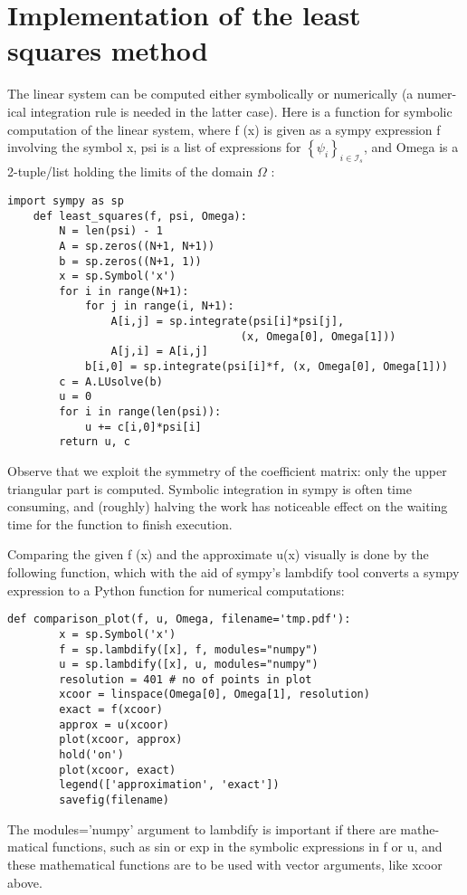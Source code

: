 \documentclass[../main.tex]{subfiles}
\begin{document}
\section[Implementation of the least squares method]{Implementation of the least squares method}
\label{sec:sec_2_4}
\noindent The linear system can be computed either symbolically or numerically (a numer-
ical integration rule is needed in the latter case). Here is a function for symbolic
computation of the linear system, where f (x) is given as a sympy expression f
involving the symbol x, psi is a list of expressions for $\left\{\psi_{i}\right\}_{i \in \mathcal{I}_{s}}$, and Omega is a 2-tuple/list holding the limits of the domain $\Omega$ :

\begin{lstlisting}[numbers=none]
	import sympy as sp
	def least_squares(f, psi, Omega):
		N = len(psi) - 1
		A = sp.zeros((N+1, N+1))
		b = sp.zeros((N+1, 1))
		x = sp.Symbol('x')
		for i in range(N+1):
			for j in range(i, N+1):
				A[i,j] = sp.integrate(psi[i]*psi[j],
									(x, Omega[0], Omega[1]))
				A[j,i] = A[i,j]
			b[i,0] = sp.integrate(psi[i]*f, (x, Omega[0], Omega[1]))
		c = A.LUsolve(b)
		u = 0
		for i in range(len(psi)):
			u += c[i,0]*psi[i]
		return u, c
\end{lstlisting}
Observe that we exploit the symmetry of the coefficient matrix: only the
upper triangular part is computed. Symbolic integration in sympy is often
time consuming, and (roughly) halving the work has noticeable effect on the
waiting time for the function to finish execution.

Comparing the given f (x) and the approximate u(x) visually is done by
the following function, which with the aid of sympy's lambdify tool converts a
sympy expression to a Python function for numerical computations:
\begin{lstlisting}[numbers=none]
	def comparison_plot(f, u, Omega, filename='tmp.pdf'):
		x = sp.Symbol('x')
		f = sp.lambdify([x], f, modules="numpy")
		u = sp.lambdify([x], u, modules="numpy")
		resolution = 401 # no of points in plot
		xcoor = linspace(Omega[0], Omega[1], resolution)
		exact = f(xcoor)
		approx = u(xcoor)
		plot(xcoor, approx)
		hold('on')
		plot(xcoor, exact)
		legend(['approximation', 'exact'])
		savefig(filename)
\end{lstlisting}
The modules='numpy' argument to lambdify is important if there are mathe-
matical functions, such as sin or exp in the symbolic expressions in f or u, and
these mathematical functions are to be used with vector arguments, like xcoor
above.
\end{document}
